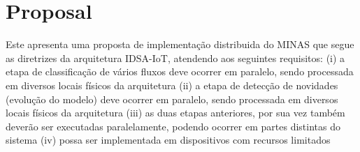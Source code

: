 
\section{Proposal}
\label{sec:prop}





Este apresenta uma proposta de implementação distribuida do MINAS que segue as diretrizes da arquitetura IDSA-IoT, atendendo aos seguintes requisitos:
(i) a etapa de classificação de vários fluxos deve ocorrer em paralelo, sendo processada em diversos locais físicos da arquitetura 
(ii) a etapa de detecção de novidades (evolução do modelo) deve ocorrer em paralelo, sendo processada em diversos locais físicos da arquitetura 
(iii)  as duas etapas anteriores, por sua vez também deverão ser executadas paralelamente, podendo ocorrer em partes distintas do sistema
(iv) possa ser implementada em dispositivos com recursos limitados 


